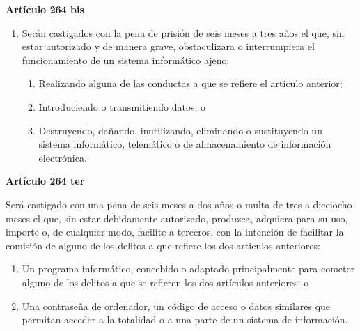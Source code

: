 \textbf{Artículo 264 bis}

\begin{enumerate}[label=\textbf{\arabic*.}]
    \item Serán castigados con la pena de prisión de seis meses a tres años el que, sin estar autorizado y de manera grave,  obstaculizara o interrumpiera el funcionamiento de un sistema informático ajeno:
          \begin{enumerate}[label=\textbf{\alph*)}]
              \item Realizando alguna de las conductas a que se refiere el articulo anterior;
              \item Introduciendo o transmitiendo datos; o
              \item Destruyendo, dañando, inutilizando, eliminando o sustituyendo un sistema informático, telemático o de almacenamiento de información electrónica.
          \end{enumerate}
\end{enumerate}

\textbf{Artículo 264 ter}

Será castigado con una pena de seis meses a dos años o multa de tres a dieciocho meses el que, sin estar debidamente autorizado, produzca, adquiera para su uso, importe o, de cualquier modo, facilite a terceros, con la intención de facilitar la comisión de alguno de los delitos a que refiere los dos artículos anteriores:
\begin{enumerate}[label=\textbf{\alph*)}]
    \item Un programa informático, concebido o adaptado principalmente para cometer alguno de los delitos a que se refieren los dos artículos anteriores; o
    \item Una contraseña de ordenador, un código de acceso o datos similares que permitan acceder a la totalidad o a una parte de un sistema de información.
\end{enumerate}

